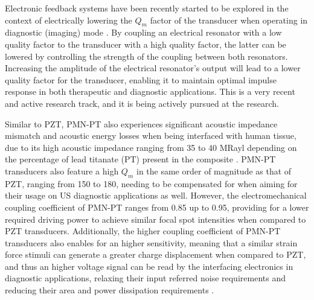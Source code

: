 Electronic feedback systems have been recently started to be explored 
in the context of electrically lowering the $Q_m$ factor of the transducer 
when operating in diagnostic (imaging) mode \cite{https://ieeexplore.ieee.org/document/8589657}.
By coupling an electrical resonator with a low quality factor to the transducer with a 
high quality factor, the latter can be lowered by controlling 
the strength of the coupling between both resonators. Increasing the 
amplitude of the electrical resonator's output will lead to 
a lower quality factor for the transducer, enabling it 
to maintain optimal impulse response in both therapeutic and diagnostic 
applications. This is a very recent and active research track, and 
it is being actively pursued at the research.

Similar to PZT, PMN-PT also experiences significant acoustic impedance mismatch 
and acoustic energy losses when being interfaced with human tissue, due to its 
high acoustic impedance ranging from 35 to 40 MRayl depending 
on the percentage of lead titanate (PT) present in the composite \cite{https://pubmed.ncbi.nlm.nih.gov/32708159/}.
PMN-PT transducers also feature a high $Q_m$ in the same order of magnitude as that of PZT, ranging from 150 to 180, 
needing to be compensated for when aiming for their usage on US diagnostic applications as well.
However, the electromechanical coupling coefficient of PMN-PT ranges from 0.85 up to 0.95, providing 
for a lower required driving power to achieve similar focal spot intensities when compared to PZT transducers. Additionally, 
the higher coupling coefficient of PMN-PT transducers also enables for an higher sensitivity, meaning that 
a similar strain force stimuli can generate a greater charge displacement when compared to PZT, and thus 
an higher voltage signal can be read by the interfacing electronics in diagnostic applications, relaxing their 
input referred noise requirements and reducing their area and power dissipation requirements \cite{https://iopscience.iop.org/article/10.1088/1361-6463/ac8687}.

